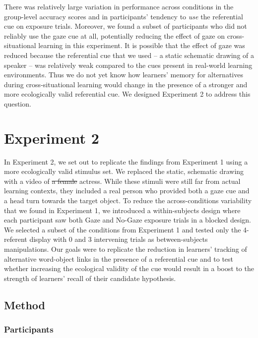 \documentclass[authoryear, review]{elsarticle}
\providecommand{\DIFaddtex}[1]{{\protect\color{blue}\uwave{#1}}} %
\providecommand{\DIFdeltex}[1]{{\protect\color{red}\sout{#1}}}                      %
\providecommand{\DIFaddbegin}{} %
\providecommand{\DIFaddend}{} %
\providecommand{\DIFdelbegin}{} %
\providecommand{\DIFdelend}{} %
\providecommand{\DIFadd}[1]{\texorpdfstring{\DIFaddtex{#1}}{#1}} %
\providecommand{\DIFdel}[1]{\texorpdfstring{\DIFdeltex{#1}}{}} %
\begin{document}
There was relatively large variation in performance across conditions in
the group-level accuracy scores and in participants' tendency to
\emph{use} the referential cue on exposure trials. Moreover, we found a
subset of participants who did not reliably use the gaze cue at all,
potentially reducing the effect of gaze on cross-situational learning in
this experiment. It is possible that the effect of gaze was reduced
because the referential cue that we used -- a static schematic drawing
of a speaker -- was relatively weak compared to the cues present in
real-world learning environments. Thus we do not yet know how learners'
memory for alternatives during cross-situational learning would change
in the presence of a stronger and more ecologically valid referential
cue. We designed Experiment 2 to address this question.

\section{Experiment 2}\label{experiment-2}

In Experiment 2, we set out to replicate the findings from Experiment 1
using a more ecologically valid stimulus set. We replaced the static,
schematic drawing with a video of \DIFdelbegin \DIFdel{a female }\DIFdelend \DIFaddbegin \DIFadd{an }\DIFaddend actress. While these stimuli were
still far from actual learning contexts, they included a real person who
provided both a gaze cue and a head turn towards the target object. To
reduce the across-conditions variability that we found in Experiment 1,
we introduced a within-subjects design where each participant saw both
Gaze and No-Gaze exposure trials in a blocked design. We selected a
subset of the conditions from Experiment 1 and tested only the
4-referent display with 0 and 3 intervening trials as between-subjects
manipulations. Our goals were to replicate the reduction in learners'
tracking of alternative word-object links in the presence of a
referential cue and to test whether increasing the ecological validity
of the cue would result in a boost to the strength of learners' recall
of their candidate hypothesis.

\subsection{Method}\label{method-1}

\subsubsection{Participants}\label{participants-1}
\end{document}
